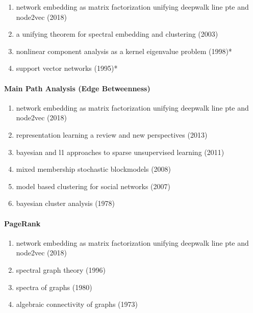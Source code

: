 \documentclass[lettepaper,]{article}
\providecommand{\tightlist}{%
  \setlength{\itemsep}{0pt}\setlength{\parskip}{0pt}}
\let\oldparagraph\paragraph
\renewcommand{\paragraph}[1]{\oldparagraph{#1}\mbox{}}
\begin{document}
\begin{enumerate}
\def\labelenumi{\arabic{enumi}.}
\tightlist
\item
  network embedding as matrix factorization unifying deepwalk line pte
  and node2vec (2018)
\item
  a unifying theorem for spectral embedding and clustering (2003)
\item
  nonlinear component analysis as a kernel eigenvalue problem (1998)*
\item
  support vector networks (1995)*
\end{enumerate}

\hypertarget{main-path-analysis-edge-betweenness-3}{%
\paragraph{Main Path Analysis (Edge
Betweenness)}\label{main-path-analysis-edge-betweenness-3}}

\begin{enumerate}
\def\labelenumi{\arabic{enumi}.}
\tightlist
\item
  network embedding as matrix factorization unifying deepwalk line pte
  and node2vec (2018)
\item
  representation learning a review and new perspectives (2013)
\item
  bayesian and l1 approaches to sparse unsupervised learning (2011)
\item
  mixed membership stochastic blockmodels (2008)
\item
  model based clustering for social networks (2007)
\item
  bayesian cluster analysis (1978)
\end{enumerate}

\hypertarget{pagerank-6}{%
\paragraph{PageRank}\label{pagerank-6}}

\begin{enumerate}
\def\labelenumi{\arabic{enumi}.}
\tightlist
\item
  network embedding as matrix factorization unifying deepwalk line pte
  and node2vec (2018)
\item
  spectral graph theory (1996)
\item
  spectra of graphs (1980)
\item
  algebraic connectivity of graphs (1973)
\end{enumerate}
\end{document}
